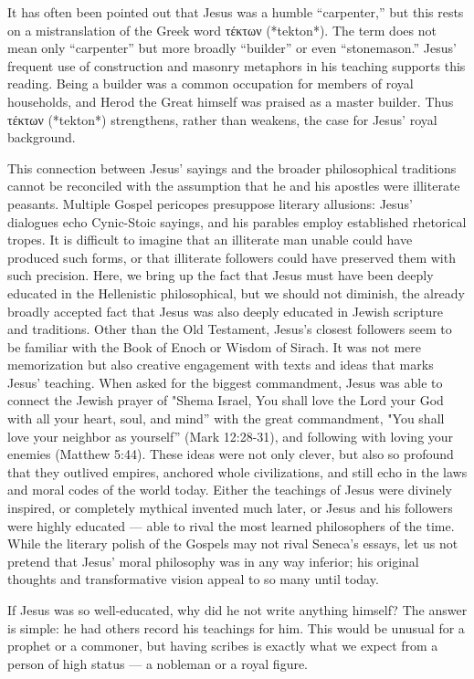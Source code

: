 It has often been pointed out that Jesus was a humble “carpenter,” but this rests on a mistranslation of the Greek word τέκτων (*tekton*).
The term does not mean only “carpenter” but more broadly “builder” or even “stonemason.”
Jesus’ frequent use of construction and masonry metaphors in his teaching supports this reading.
Being a builder was a common occupation for members of royal households, and Herod the Great himself was praised as a master builder.
Thus τέκτων (*tekton*) strengthens, rather than weakens, the case for Jesus’ royal background.

This connection between Jesus’ sayings and the broader philosophical traditions cannot be reconciled with the assumption that he and his apostles were illiterate peasants.
Multiple Gospel pericopes presuppose literary allusions: Jesus’ dialogues echo Cynic-Stoic sayings, and his parables employ established rhetorical tropes.
It is difficult to imagine that an illiterate man unable could have produced such forms, or that illiterate followers could have preserved them with such precision.
Here, we bring up the fact that Jesus must have been deeply educated in the Hellenistic philosophical, but we should not diminish, the already broadly accepted fact that Jesus was also deeply educated in Jewish scripture and traditions.
Other than the Old Testament, Jesus's closest followers seem to be familiar with the Book of Enoch or Wisdom of Sirach.
It was not mere memorization but also creative engagement with texts and ideas that marks Jesus’ teaching.
When asked for the biggest commandment, Jesus was able to connect the Jewish prayer of "Shema Israel, You shall love the Lord your God with all your heart, soul, and mind'' with the great commandment, "You shall love your neighbor as yourself'' (Mark 12:28-31), and following with loving your enemies (Matthew 5:44).
These ideas were not only clever, but also so profound that they outlived empires, anchored whole civilizations, and still echo in the laws and moral codes of the world today.
Either the teachings of Jesus were divinely inspired, or completely mythical invented much later, or Jesus and his followers were highly educated — able to rival the most learned philosophers of the time.
While the literary polish of the Gospels may not rival Seneca’s essays, let us not pretend that Jesus’ moral philosophy was in any way inferior; his original thoughts and transformative vision appeal to so many until today.

If Jesus was so well-educated, why did he not write anything himself?
The answer is simple: he had others record his teachings for him.
This would be unusual for a prophet or a commoner, but having scribes is exactly what we expect from a person of high status — a nobleman or a royal figure.

